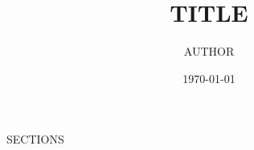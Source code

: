 \documentclass{article}
\begin{document}
\title{TITLE}
\author{AUTHOR}
\date{\today}
\maketitle

SECTIONS

\printbibliography
\end{document}

